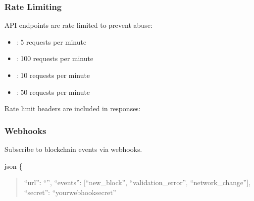 \documentclass[letterpaper,10pt,english]{sphinxmanual}
\begin{document}
\subsubsection{Rate Limiting}
\label{\detokenize{api/rest-api:rate-limiting}}
\sphinxAtStartPar
API endpoints are rate limited to prevent abuse:
\begin{itemize}
\item {} 
\sphinxAtStartPar
{}: 5 requests per minute

\item {} 
\sphinxAtStartPar
{}: 100 requests per minute

\item {} 
\sphinxAtStartPar
{}: 10 requests per minute

\item {} 
\sphinxAtStartPar
{}: 50 requests per minute

\end{itemize}

\sphinxAtStartPar
Rate limit headers are included in responses:

\sphinxAtStartPar
{}


\subsubsection{Webhooks}
\label{\detokenize{api/rest-api:webhooks}}
\sphinxAtStartPar
Subscribe to blockchain events via webhooks.

\sphinxAtStartPar
{} 

\sphinxAtStartPar
{}
{\color{red}\bfseries{}\textasciigrave{}\textasciigrave{}}{\color{red}\bfseries{}\textasciigrave{}}json
\{
\begin{quote}

\sphinxAtStartPar
“url”: “”,
“events”: {[}“new\_block”, “validation\_error”, “network\_change”{]},
“secret”: “your\sphinxhyphen{}webhook\sphinxhyphen{}secret”
\end{quote}
\end{document}
